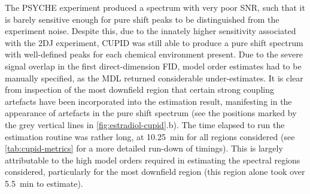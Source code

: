 The \ac{PSYCHE} experiment produced a spectrum with very poor
\ac{SNR}, such that it is barely sensitive enough for pure shift peaks to be
distinguished from the experiment noise. Despite this, due to the innately higher
sensitivity associated with the \ac{2DJ} experiment, \ac{CUPID} was still able
to produce a pure shift spectrum with well-defined peaks for each chemical
environment present. Due to the severe signal overlap in the first
direct-dimension \ac{FID}, model order estimates had to be
manually specified, as the \ac{MDL} returned considerable under-estimates. It
is clear from inspection of the most downfield region
that certain strong coupling artefacts have been incorporated into the
estimation result, manifesting in the appearance of artefacts in the pure shift
spectrum (see the positions marked by the grey vertical lines in
\cref{fig:estradiol-cupid}.b).
The time elapsed to run the estimation routine was rather
long, at \qty{10.25}{\minute} for all regions considered (see
\cref{tab:cupid-metrics} for a more detailed run-down of timings). This is
largely attributable to the high model orders required in estimating the
spectral regions considered, particularly for the most downfield region (this
region alone took over \qty{5.5}{\minute} to estimate).
